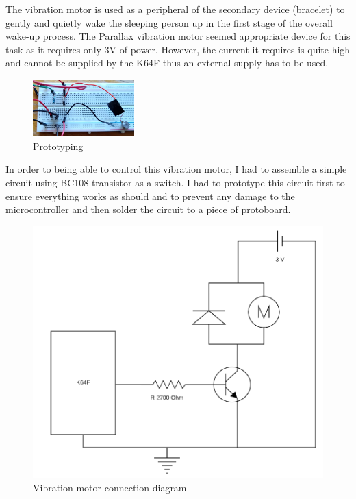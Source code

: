 \documentclass[12pt,a4paper]{article}
\begin{document}
		The vibration motor is used as a peripheral of the secondary device (bracelet) to gently and quietly wake the sleeping person up in the first stage of the overall wake-up process. The Parallax vibration motor seemed appropriate device for this task as it requires only 3V of power. However, the current it requires is quite high and cannot be supplied by the K64F thus an external supply has to be used.\\
		
		
        \begin{figure}
         \centering
         \includegraphics[width=0.35\textwidth]{circuit_proto.jpg}
         \caption{Prototyping}
        \end{figure}
        
        In order to being able to control this vibration motor, I had to assemble a simple circuit using BC108 transistor as a switch. I had to prototype this circuit first to ensure everything works as should and to prevent any damage to the microcontroller and then solder the circuit to a piece of protoboard.\\
        
		\begin{figure}[h]
			\centering
			\includegraphics[scale=0.3]{motor_diag1.png}
			\caption{Vibration motor connection diagram}
			\label{fig:vibMotorConnDiag}
		\end{figure}
        
\end{document}
